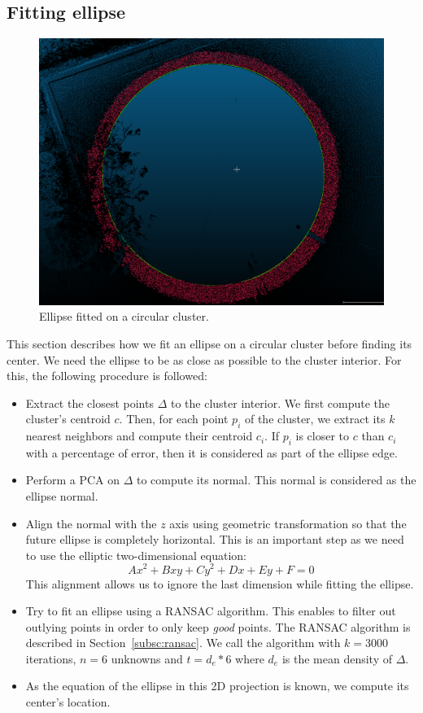 \subsection{Fitting ellipse}
\label{subsc:fit}
\begin{figure}[h]
  \centering
  \includegraphics[scale=0.4]{img/ellipse.png}
  \caption{Ellipse fitted on a circular cluster.}
  \label{fig:ellipse}
\end{figure}

This section describes how we fit an ellipse on a circular cluster before finding its center. We need the ellipse to be as close as possible to the cluster interior.
For this, the following procedure is followed:
\begin{itemize}
\item Extract the closest points $\Delta$ to the cluster interior. We first compute the cluster's centroid $c$. Then, for each point $p_i$ of the cluster, we extract its $k$ nearest neighbors and compute their centroid $c_i$. If $p_i$ is closer to $c$ than $c_i$ with a percentage of error, then it is considered as part of the ellipse edge.
\item Perform a PCA on $\Delta$ to compute its normal. This normal is considered as the ellipse normal.
\item Align the normal with the $z$ axis using geometric transformation so that the future ellipse is completely horizontal. This is an important step as we need to use the elliptic two-dimensional equation:
  \begin{equation}
    Ax^2 + Bxy + Cy^2 + Dx + Ey + F = 0
  \end{equation}
  This alignment allows us to ignore the last dimension while fitting the ellipse.
\item Try to fit an ellipse using a RANSAC algorithm. This enables to filter out outlying points in order to only keep \emph{good} points. The RANSAC algorithm is described in Section~\ref{subsc:ransac}. We call the algorithm with $k = 3000$ iterations, $n = 6$ unknowns and $t = d_e * 6$ where $d_e$ is the mean density of $\Delta$.
\item As the equation of the ellipse in this 2D projection is known, we compute its center's location.
\end{itemize}

